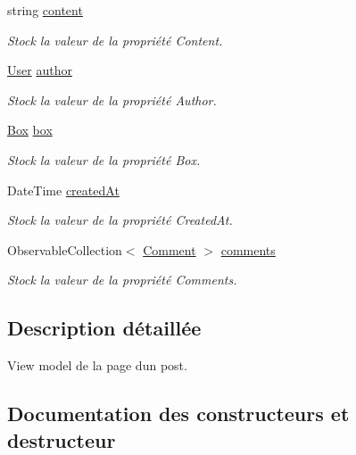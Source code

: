 \begin{DoxyCompactItemize}
string \hyperlink{class_boxes_1_1_view_models_1_1_post_view_model_a0482a2e9d39016182354f88d1eb1d115}{content}
\begin{DoxyCompactList}\small\item\em Stock la valeur de la propriété {\ttfamily Content}. \end{DoxyCompactList}\item 
\hyperlink{class_boxes_1_1_models_1_1_user}{User} \hyperlink{class_boxes_1_1_view_models_1_1_post_view_model_a636f0295b5a4ba46bc159d5b347dda3c}{author}
\begin{DoxyCompactList}\small\item\em Stock la valeur de la propriété {\ttfamily Author}. \end{DoxyCompactList}\item 
\hyperlink{class_boxes_1_1_models_1_1_box}{Box} \hyperlink{class_boxes_1_1_view_models_1_1_post_view_model_a1beb2defa66dccf16c92b47013305205}{box}
\begin{DoxyCompactList}\small\item\em Stock la valeur de la propriété {\ttfamily Box}. \end{DoxyCompactList}\item 
Date\+Time \hyperlink{class_boxes_1_1_view_models_1_1_post_view_model_a4fe5c87ad1587445397b366715866491}{created\+At}
\begin{DoxyCompactList}\small\item\em Stock la valeur de la propriété {\ttfamily Created\+At}. \end{DoxyCompactList}\item 
Observable\+Collection$<$ \hyperlink{class_boxes_1_1_models_1_1_comment}{Comment} $>$ \hyperlink{class_boxes_1_1_view_models_1_1_post_view_model_a3a9891cf2783a87c3c8357b31f96b911}{comments}
\begin{DoxyCompactList}\small\item\em Stock la valeur de la propriété {\ttfamily Comments}. \end{DoxyCompactList}\end{DoxyCompactItemize}


\subsection{Description détaillée}
View model de la page d\textquotesingle{}un post. 



\subsection{Documentation des constructeurs et destructeur}
